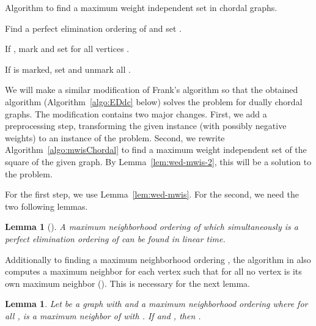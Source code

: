 \documentclass[]{elsarticle}
\newtheorem{lemma}[theorem]{Lemma}
\def\mwis{{\sc{MWIS }}}
\def\minwed{{\sc{Min-WED }}}
\begin{document}
\begin{algorithm}
\caption{\cite{Frank} Algorithm to find a maximum weight independent set in chordal graphs.}\label{algo:mwisChordal}


Find a perfect elimination ordering  of  and set . \label{line:mwisChorFindPEO}

\For{ \KwTo }
{
    If , mark  and set  for all vertices .
}

\For{}
{
    If  is marked, set  and unmark all .
}

\Return{}
\end{algorithm}


We will make a similar modification of Frank's algorithm so that the obtained algorithm (Algorithm~\ref{algo:EDdc} below) solves the \minwed problem for dually chordal graphs. 
The modification contains two major changes. 
First, we add a preprocessing step, transforming the given \minwed instance (with possibly negative weights) to an instance of the \mwis problem. 
Second, we rewrite Algorithm~\ref{algo:mwisChordal} to find a maximum weight independent set of the square of the given graph. 
By Lemma~\ref{lem:wed-mwis-2}, this will be a solution to the \minwed problem.

For the first step, we use Lemma~\ref{lem:wed-mwis}. 
For the second, we need the two following lemmas.

\begin{lemma}[\cite{BCD98}]\label{lem:MNO_linear}
    A maximum neighborhood ordering of  which simultaneously is a perfect elimination ordering of  can be found in linear time.
\end{lemma}

Additionally to finding a maximum neighborhood ordering , the algorithm in \cite{BCD98} also computes a maximum neighbor  for each vertex  such that for all  no vertex  is its own maximum neighbor (). 
This is necessary for the next lemma.

\begin{lemma}\label{lem:ijInE_iff_mjInE2}
Let  be a graph with  and a maximum neighborhood ordering  where for all ,  is a maximum neighbor of  with . 
If  and , then .
\end{lemma}
\end{document}
